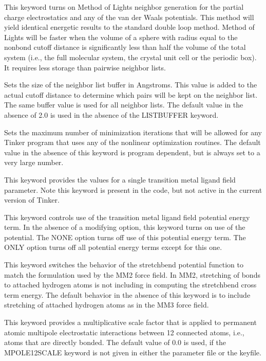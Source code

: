 \documentclass[letterpaper,11pt,english]{sphinxmanual}
\begin{document}
  This keyword turns on Method of Lights neighbor generation for the partial charge electrostatics and any of the van der Waals potentials. This method will yield identical energetic results to the standard double loop method. Method of Lights will be faster when the volume of a sphere with radius equal to the nonbond cutoff distance is significantly less than half the volume of the total system (i.e., the full molecular system, the crystal unit cell or the periodic box). It requires less storage than pairwise neighbor lists.

  Sets the size of the neighbor list buffer in Angstroms. This value is added to the actual cutoff distance to determine which pairs will be kept on the neighbor list. The same buffer value is used for all neighbor lists. The default value in the absence of 2.0 is used in the absence of the LIST\sphinxhyphen{}BUFFER keyword.

  Sets the maximum number of minimization iterations that will be allowed for any Tinker program that uses any of the nonlinear optimization routines. The default value in the absence of this keyword is program dependent, but is always set to a very large number.

  This keyword provides the values for a single transition metal ligand field parameter. Note this keyword is present in the code, but not active in the current version of Tinker.

  This keyword controls use of the transition metal ligand field potential energy term. In the absence of a modifying option, this keyword turns on use of the potential. The NONE option turns off use of this potential energy term. The ONLY option turns off all potential energy terms except for this one.

  This keyword switches the behavior of the stretch\sphinxhyphen{}bend potential function to match the formulation used by the MM2 force field. In MM2, stretching of bonds to attached hydrogen atoms is not including in computing the stretch\sphinxhyphen{}bend cross term energy. The default behavior in the absence of this keyword is to include stretching of attached hydrogen atoms as in the MM3 force field.

  This keyword provides a multiplicative scale factor that is applied to permanent atomic multipole electrostatic interactions between 1\sphinxhyphen{}2 connected atoms, i.e., atoms that are directly bonded. The default value of 0.0 is used, if the MPOLE\sphinxhyphen{}12\sphinxhyphen{}SCALE keyword is not given in either the parameter file or the keyfile.
\end{document}
